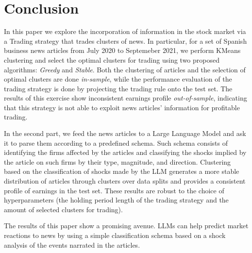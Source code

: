 \section{Conclusion}

\hspace{0.5cm} In this paper we explore the incorporation of information in the stock market via a Trading strategy that trades clusters of news. In particular, for a set of Spanish business news articles from July 2020 to Septemeber 2021, we perform KMeans clustering and select the optimal clusters for trading using two proposed algorithms: \textit{Greedy} and \textit{Stable}. Both the clustering of articles and the selection of optimal clusters are done \textit{in-sample}, while the performance evaluation of the trading strategy is done by projecting the trading rule onto the test set. The results of this exercise show inconsistent earnings profile \textit{out-of-sample}, indicating that this strategy is not able to exploit news articles' information for profitable trading.

\mx 
In the second part, we feed the news articles to a Large Language Model and ask it to parse them according to a predefined schema. Such schema consists of identifying the firms affected by the articles and classifying the shocks implied by the article on such firms by their type, magnitude, and direction. Clustering based on the classification of shocks made by the LLM generates a more stable distribution of articles through clusters over data splits and provides a consistent profile of earnings in the test set. These results are robust to the choice of hyperparameters (the holding period length of the trading strategy and the amount of selected clusters for trading).

\mx 
The results of this paper show a promising avenue. LLMs can help predict market reactions to news by using a simple classification schema based on a shock analysis of the events narrated in the articles. 



